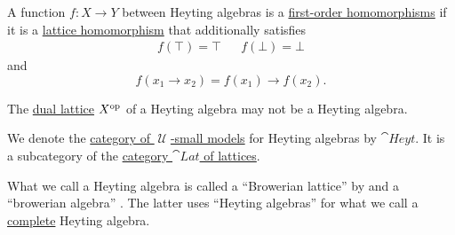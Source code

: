 \begin{definition}
\begin{thmenum}[resume=def:heyting_algebra]
     A function \( f: X \to Y \) between Heyting algebras is a \hyperref[def:first_order_homomorphism]{first-order homomorphisms} if it is a \hyperref[def:lattice/homomorphism]{lattice homomorphism} that additionally satisfies
    \begin{align}\label{eq:def:heyting_algebra/homomorphism/top_bottom}
      f(\top) = \top
      &&
      f(\bot) = \bot
    \end{align}
    and
    \begin{equation}\label{eq:def:heyting_algebra/homomorphism/operation}
      f(x_1 \rightarrow x_2) = f(x_1) \rightarrow f(x_2).
    \end{equation}

     The \hyperref[def:lattice/opposite]{dual lattice} \( X^{\operatorname{op}} \) of a Heyting algebra may not be a Heyting algebra.

     We denote the \hyperref[def:category_of_small_first_order_models]{category of \( \mscrU \)-small models} for Heyting algebras by \( \cat{Heyt} \). It is a subcategory of the \hyperref[def:lattice/category]{category \( \cat{Lat} \) of lattices}.
  \end{thmenum}
\end{definition}
\begin{comments}
  \item What we call a Heyting algebra is called a \enquote{Browerian lattice} by  and a \enquote{browerian algebra} . The latter uses \enquote{Heyting algebras} for what we call a \hyperref[def:complete_lattice]{complete} Heyting algebra.
\end{comments}
